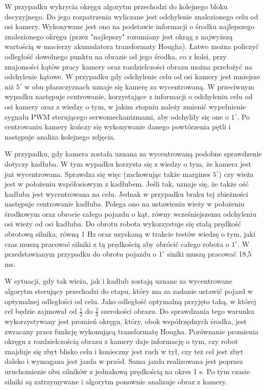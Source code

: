 W przypadku wykrycia okręgu algorytm przechodzi do kolejnego bloku decyzyjnego. Do jego rozpatrzenia wyliczane jest odchylenie znalezionego celu od osi kamery. Wykonywane jest ono na podstawie informacji o środku najlepszego znalezionego okręgu (przez "najlepszy" rozumiany jest okrąg z najwyższą wartością w macierzy akumulatora transformaty Hougha). Łatwo można policzyć odległość dowolnego punktu na obrazie od jego środka, co z kolei, przy znajomości kątów pracy kamery oraz rozdzielczości obrazu można przełożyć na odchylenie kątowe. W przypadku gdy odchylenie celu od osi kamery jest mniejsze niż $5^\circ$ w obu płaszczyznach uznaje się kamerę za wycentrowaną. W przeciwnym wypadku następuje centrowanie, korzystające z informacji o odchyleniu celu od osi kamery oraz z wiedzy o tym, w jakim stopniu należy zmienić wypełnienie sygnału PWM sterującego serwomechanizmami, aby odchyliły się one o $1^\circ$. Po centrowaniu kamery kończy się wykonywanie danego powtórzenia pętli i następuje analiza kolejnego zdjęcia.

W przypadku, gdy kamera została uznana za wycentrowaną podobne sprawdzenie dotyczy kadłuba. W tym wypadku korzysta się z wiedzy o tym, że kamera jest już wycentrowana. Sprawdza się więc (zachowując także margines $5^\circ$) czy wieża jest w położeniu współosiowym z kadłubem. Jeśli tak, uznaje się, że także ość kadłuba jest wycentrowana na celu. Jednak w przypadku braku tej zbieżności następuje centrowanie kadłuba. Polega ono na ustawieniu wieży w położeniu środkowym oraz obrocie całego pojazdu o kąt, równy wcześniejszemu odchyleniu osi wieży od osi kadłuba. Do obrotu robota wykorzystuje się stałą prędkość obrotową silnika, równą 1 Hz oraz uzyskaną w trakcie testów wiedzę o tym, jaki czas muszą pracować silniki z tą prędkością aby obrócić całego robota o $1^\circ$. W przedstawianym przypadku do obrotu pojazdu o $1^\circ$ siniki muszą pracować 18,5 ms.

W sytuacji, gdy tak wieża, jak i kadłub zostają uznane za wycentrowane algorytm sterujący przechodzi do etapu, który ma za zadanie ustawić pojazd w optymalnej odległości od celu. Jako odległość optymalną przyjęto taką, w której cel będzie zajmował od $\frac{1}{2}$ do $\frac{2}{3}$ szerokości obrazu. Do sprawdzania tego warunku wykorzystywany jest promień okręgu, który, obok współrzędnych środka, jest zwracany przez funkcję wykonującą transformatę Hougha. Porównanie promienia okręgu z rozdzielczością obrazu z kamery daje informację o tym, czy robot znajduje się zbyt blisko celu i konieczny jest ruch w tył, czy też cel jest zbyt daleko i wymagana jest jazda w przód. Sama jazda realizowana jest poprzez uruchomienie obu silników z jednakową prędkością na okres 1 s. Po tym czasie silniki są zatrzymywane i algorytm ponownie analizuje obraz z kamery.

















    
